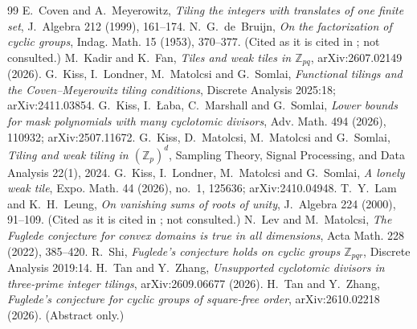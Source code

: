 \documentclass[11pt,a4paper]{amsart}
\theoremstyle{definition}
\theoremstyle{remark}
\newcommand{\Z}{\mathbb{Z}}
\begin{document}
\begin{thebibliography}{99}
 E.~Coven and A.~Meyerowitz, \emph{Tiling the integers with translates of one finite set},
 J.~Algebra 212 (1999), 161--174.
 N.~G.~de~Bruijn, \emph{On the factorization of cyclic groups}, Indag. Math. 15 (1953), 370--377.
 (Cited as it is cited in \cite{KLaMS}; not consulted.)
 M.~Kadir and K.~Fan, \emph{Tiles and weak tiles in $\Z_{pq}$}, arXiv:2607.02149 (2026).
 G.~Kiss, I.~Londner, M.~Matolcsi and G.~Somlai, \emph{Functional tilings and the
 Coven--Meyerowitz tiling conditions}, Discrete Analysis 2025:18; arXiv:2411.03854.
 G.~Kiss, I.~{\L}aba, C.~Marshall and G.~Somlai, \emph{Lower bounds for mask polynomials with many
 cyclotomic divisors}, Adv. Math. 494 (2026), 110932; arXiv:2507.11672.
 G.~Kiss, D.~Matolcsi, M.~Matolcsi and G.~Somlai, \emph{Tiling and weak tiling in $(\Z_p)^d$},
 Sampling Theory, Signal Processing, and Data Analysis 22(1), 2024.
 G.~Kiss, I.~Londner, M.~Matolcsi and G.~Somlai, \emph{A lonely weak tile}, Expo. Math. 44
 (2026), no.~1, 125636; arXiv:2410.04948.
 T.~Y.~Lam and K.~H.~Leung, \emph{On vanishing sums of roots of unity}, J.~Algebra 224 (2000),
 91--109. (Cited as it is cited in \cite{KLaMS}; not consulted.)
 N.~Lev and M.~Matolcsi, \emph{The Fuglede conjecture for convex domains is true in all
 dimensions}, Acta Math. 228 (2022), 385--420.
 R.~Shi, \emph{Fuglede's conjecture holds on cyclic groups $\Z_{pqr}$}, Discrete Analysis 2019:14.
 H.~Tan and Y.~Zhang, \emph{Unsupported cyclotomic divisors in three-prime integer tilings},
 arXiv:2609.06677 (2026).
 H.~Tan and Y.~Zhang, \emph{Fuglede's conjecture for cyclic groups of square-free order},
 arXiv:2610.02218 (2026). (Abstract only.)
\end{thebibliography}
\end{document}
